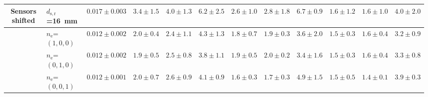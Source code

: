 \begin{table}
\begin{tabular}{cl r rrr rrr rrr}
Sensors shifted & $d_{\mathrm{s},\mathrm{r}}$=\SI{16}{mm} & $0.017 \pm 0.003$ & $3.4 \pm 1.5$ & $4.0 \pm 1.3$ & $6.2 \pm 2.5$ & $2.6 \pm 1.0$ & $2.8 \pm 1.8$ & $6.7 \pm 0.9$ & $1.6 \pm 1.2$ & $1.6 \pm 1.0$ & $4.0 \pm 2.0$ \\
\midrule
{} & $n_\mathrm{e}$=$(1,0,0)$ & $0.012 \pm 0.002$ & $2.0 \pm 0.4$ & $2.4 \pm 1.1$ & $4.3 \pm 1.3$ & $1.8 \pm 0.7$ & $1.9 \pm 0.3$ & $3.6 \pm 2.0$ & $1.5 \pm 0.3$ & $1.6 \pm 0.4$ & $3.2 \pm 0.9$\\
& $n_\mathrm{e}$=$(0,1,0)$ & $0.012 \pm 0.002$ & $1.9 \pm 0.5$ & $2.5 \pm 0.8$ & $3.8 \pm 1.1$ & $1.9 \pm 0.5$ & $2.0 \pm 0.2$ & $3.4 \pm 1.6$ & $1.5 \pm 0.3$ & $1.6 \pm 0.4$ & $3.3 \pm 0.8$\\
& $n_\mathrm{e}$=$(0,0,1)$ & $0.012 \pm 0.001$ & $2.0 \pm 0.7$ & $2.6 \pm 0.9$ & $4.1 \pm 0.9$ & $1.6 \pm 0.3$ & $1.7 \pm 0.3$ & $4.9 \pm 1.5$ & $1.5 \pm 0.5$ & $1.4 \pm 0.1$ & $3.9 \pm 0.3$\\
\bottomrule
\end{tabular}
\label{tab:results_pcc_simulations}
\end{table}
\endgroup

